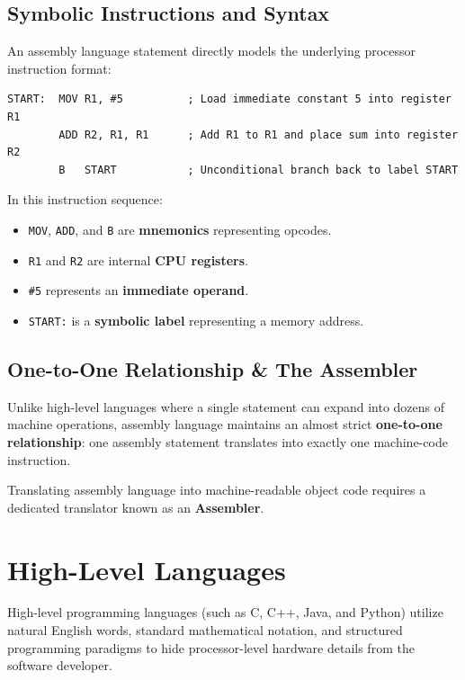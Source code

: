 \subsection{Symbolic Instructions and Syntax}
An assembly language statement directly models the underlying processor instruction format:
\begin{lstlisting}[language={[x86masm]Assembler}]
START:  MOV R1, #5          ; Load immediate constant 5 into register R1
        ADD R2, R1, R1      ; Add R1 to R1 and place sum into register R2
        B   START           ; Unconditional branch back to label START
\end{lstlisting}
In this instruction sequence:
\begin{itemize}[leftmargin=1.2em]
    \item \texttt{MOV}, \texttt{ADD}, and \texttt{B} are \textbf{mnemonics} representing opcodes.
    \item \texttt{R1} and \texttt{R2} are internal \textbf{CPU registers}.
    \item \texttt{\#5} represents an \textbf{immediate operand}.
    \item \texttt{START:} is a \textbf{symbolic label} representing a memory address.
\end{itemize}

\subsection{One-to-One Relationship \& The Assembler}
Unlike high-level languages where a single statement can expand into dozens of machine operations, assembly language maintains an almost strict \textbf{one-to-one relationship}: one assembly statement translates into exactly one machine-code instruction.

Translating assembly language into machine-readable object code requires a dedicated translator known as an \textbf{Assembler}.

\section{High-Level Languages}

High-level programming languages (such as C, C++, Java, and Python) utilize natural English words, standard mathematical notation, and structured programming paradigms to hide processor-level hardware details from the software developer.

